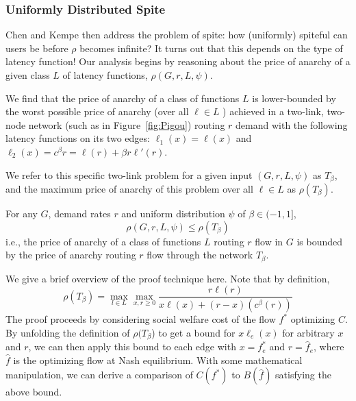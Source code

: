 \subsubsection{Uniformly Distributed Spite}
Chen and Kempe then address the problem of spite: how (uniformly) spiteful can users be before $\rho$ becomes infinite?
It turns out that this depends on the type of latency function! Our analysis begins by reasoning about the price of anarchy of a given class ${L}$ of latency functions, 
$\rho(G,r,{L},\psi)$.

We find that the price of anarchy of a class of functions $L$ is lower-bounded by the worst possible price of anarchy (over all $\ell \in L$ ) achieved in a two-link, two-node network (such as in Figure~\ref{fig:Pigou}) routing $r$ demand with the following latency functions on its two edges:
$\ell_1(x) = \ell(x)$ and $\ell_2(x) = c^\beta{r} = \ell(r) +\beta r\ell'(r)$.

We refer to this specific two-link problem for a given input $(G,r,L,\psi)$ as $T_\beta$, and the maximum price of anarchy of this problem over all $\ell \in L$ as $\rho(T_\beta)$.
\begin{theorem}
For any $G$, demand rates $r$ and uniform distribution $\psi$ of $\beta \in (-1, 1]$,
    $$\rho(G,r,{L},\psi) \le \rho(T_\beta)$$
   i.e., the price of anarchy of a class of functions $L$ routing $r$ flow in $G$ is 
    bounded by the price of anarchy routing $r$ flow through the network $T_\beta$.
    \end{theorem}
\begin{proof-sketch}
    We give a brief overview of the proof technique here.
    Note that by definition, $$\rho(T_\beta) = \max_{l\in{L}} \max_{x,r\ge 0} \frac{r\ell(r)}{x\ell(x) + (r-x)(c^\beta(r))}$$
    The proof proceeds by considering social welfare cost of the flow $f^*$ optimizing $C$. By unfolding the definition of $\rho(T_\beta$) to get a bound for $x\ell_e(x)$ for arbitrary $x$ and $r$, we can then apply this bound to each edge with $x = f^*_e$ and $r = \hat{f}_e$, where $\hat{f}$ is the optimizing flow at Nash equilibrium. With some mathematical manipulation, we can derive a comparison of $C(f^*)$ to $B(\hat{f})$ satisfying the above bound.
\end{proof-sketch}

